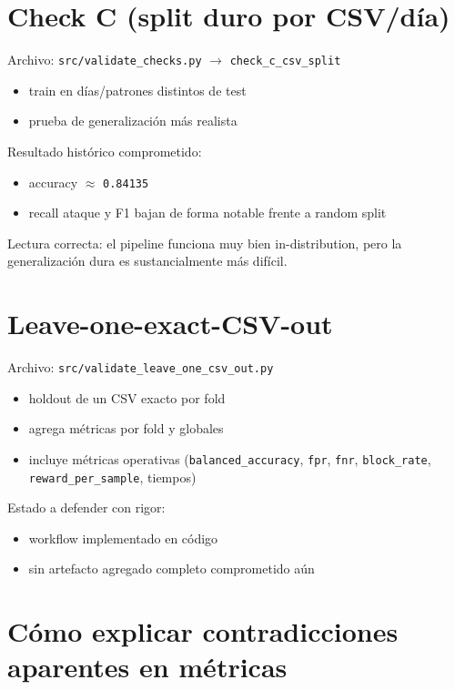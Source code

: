 ﻿\documentclass[12pt,a4paper]{article}
\begin{document}
\section{Check C (split duro por CSV/día)}

Archivo: \verb|src/validate_checks.py| $\to$ \verb|check_c_csv_split|

\begin{itemize}
  \item train en días/patrones distintos de test
  \item prueba de generalización más realista
\end{itemize}

Resultado histórico comprometido:

\begin{itemize}
  \item accuracy $\approx$ \texttt{0.84135}
  \item recall ataque y F1 bajan de forma notable frente a random split
\end{itemize}

Lectura correcta: el pipeline funciona muy bien in-distribution, pero la generalización dura es
sustancialmente más difícil.

\section{Leave-one-exact-CSV-out}

Archivo: \verb|src/validate_leave_one_csv_out.py|

\begin{itemize}
  \item holdout de un CSV exacto por fold
  \item agrega métricas por fold y globales
  \item incluye métricas operativas (\texttt{balanced\_accuracy}, \texttt{fpr}, \texttt{fnr},
        \texttt{block\_rate}, \texttt{reward\_per\_sample}, tiempos)
\end{itemize}

Estado a defender con rigor:

\begin{itemize}
  \item workflow implementado en código
  \item sin artefacto agregado completo comprometido aún
\end{itemize}

\section{Cómo explicar contradicciones aparentes en métricas}
\end{document}
